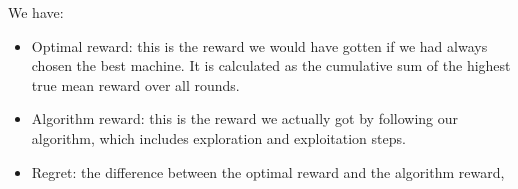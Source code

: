 \documentclass[letterpaper,10pt,english]{jupyterBook}
\begin{document}
\sphinxAtStartPar
We have:
\begin{itemize}
\item {} 
\sphinxAtStartPar
Optimal reward: this is the reward we would have gotten if we had always chosen the best machine. It is calculated as the cumulative sum of the highest true mean reward over all rounds.

\item {} 
\sphinxAtStartPar
Algorithm reward: this is the reward we actually got by following our algorithm, which includes exploration and exploitation steps.

\item {} 
\sphinxAtStartPar
Regret: the difference between the optimal reward and the algorithm reward,

\end{itemize}
\end{document}

